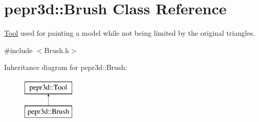 \hypertarget{classpepr3d_1_1_brush}{}\section{pepr3d\+::Brush Class Reference}
\label{classpepr3d_1_1_brush}


\mbox{\hyperlink{classpepr3d_1_1_tool}{Tool}} used for painting a model while not being limited by the original triangles.  




{\ttfamily \#include $<$Brush.\+h$>$}

Inheritance diagram for pepr3d\+::Brush\+:\begin{figure}[H]
\begin{center}
\leavevmode
\includegraphics[height=2.000000cm]{classpepr3d_1_1_brush}
\end{center}
\end{figure}

